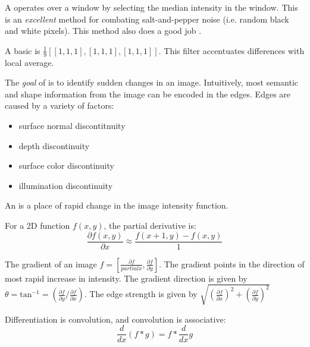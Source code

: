 \documentclass{article}
\begin{document}
\begin{definition}
  A  operates over a window by selecting the median intensity in the window. This is an \emph{excellent} method for combating salt-and-pepper noise (i.e. random black and white pixels). This method also does a good job . 
\end{definition}

\begin{remark}
  A basic  is $\frac{1}{9}[[1,1,1],[1,1,1],[1,1,1]]$. This filter accentuates differences with local average. 
\end{remark}

The \emph{goal} of  is to identify sudden changes in an image. Intuitively, most semantic and shape information from the image can be encoded in the edges. Edges are caused by a variety of factors: 
\begin{itemize}
  \item surface normal discontitnuity 
  \item depth discontinuity 
  \item surface color discontinuity 
  \item illumination discontinuity
\end{itemize}

An  is a place of rapid change in the image intensity function. 

\begin{remark}
  For a 2D function $f(x,y)$, the partial derivative is: 
  $$\frac{\partial f(x,y)}{\partial x} \approx \frac{f(x+1,y)-f(x,y)}{1}$$
\end{remark}

\begin{definition}
  The gradient of an image $f = [\frac{\partial f}{partial x}, \frac{\partial f}{\partial y}]$. The gradient points in the direction of most rapid increase in intensity. The gradient direction is given by $\theta = \textrm{tan}^{-1} = (\frac{\partial f}{\partial y} / \frac{\partial f}{\partial x})$. The edge strength is given by $\sqrt{(\frac{\partial f}{\partial x})^2 + (\frac{\partial f}{\partial y})^2}$
\end{definition}

\begin{definition}
  Differentiation is convolution, and convolution is associative: $$\frac{d}{dx}(f * g) = f * \frac{d}{dx}g$$
\end{definition}
\end{document}
